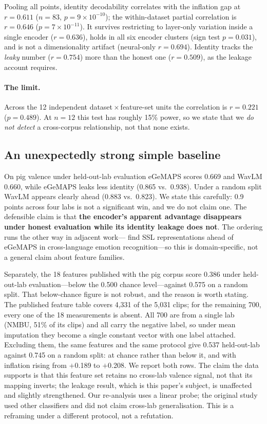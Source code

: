 \documentclass{article}
\begin{document}
Pooling all points, identity decodability correlates with the inflation gap at $r{=}0.611$
($n{=}83$, $p{=}9\times10^{-10}$); the within-dataset partial correlation is $r{=}0.646$
($p{=}7\times10^{-11}$). It survives restricting to layer-only variation inside a single encoder
($r{=}0.636$), holds in all six encoder clusters (sign test $p{=}0.031$), and is not a dimensionality
artifact (neural-only $r{=}0.694$). Identity tracks the \emph{leaky} number ($r{=}0.754$) more than
the honest one ($r{=}0.509$), as the leakage account requires.

\paragraph{The limit.} Across the 12 independent dataset\,$\times$\,feature-set units the correlation
is $r{=}0.221$ ($p{=}0.489$). At $n{=}12$ this test has roughly 15\% power, so we state that we
\emph{do not detect} a cross-corpus relationship, not that none exists.

\subsection{An unexpectedly strong simple baseline}\label{sec:baseline}

On pig valence under held-out-lab evaluation eGeMAPS scores 0.669 and WavLM 0.660, while eGeMAPS
leaks less identity (0.865 vs.\ 0.938). Under a random split WavLM appears clearly ahead (0.883 vs.\
0.823). We state this carefully: 0.9 points across four labs is not a significant win, and we do not
claim one. The defensible claim is that \textbf{the encoder's apparent advantage disappears under
honest evaluation while its identity leakage does not}. The ordering runs the other way in adjacent
work---\citet{tang2023} find SSL representations ahead of eGeMAPS in cross-language emotion
recognition---so this is domain-specific, not a general claim about feature families.

Separately, the 18 features published with the pig corpus score 0.386 under held-out-lab
evaluation---below the 0.500 chance level---against 0.575 on a random split. That below-chance figure
is not robust, and the reason is worth stating. The published feature table covers 4{,}331 of the
5{,}031 clips; for the remaining 700, every one of the 18 measurements is absent. All 700 are from a
single lab (NMBU, 51\% of its clips) and all carry the negative label, so under mean imputation they
become a single constant vector with one label attached. Excluding them, the same features and the
same protocol give 0.537 held-out-lab against 0.745 on a random split: at chance rather than below
it, and with inflation rising from $+$0.189 to $+$0.208. We report both rows. The claim the data
supports is that this feature set retains no cross-lab valence signal, not that its mapping inverts;
the leakage result, which is this paper's subject, is unaffected and slightly strengthened. Our
re-analysis uses a linear probe; the original study used other classifiers and did not claim cross-lab
generalisation. This is a reframing under a different protocol, not a refutation.
\end{document}
